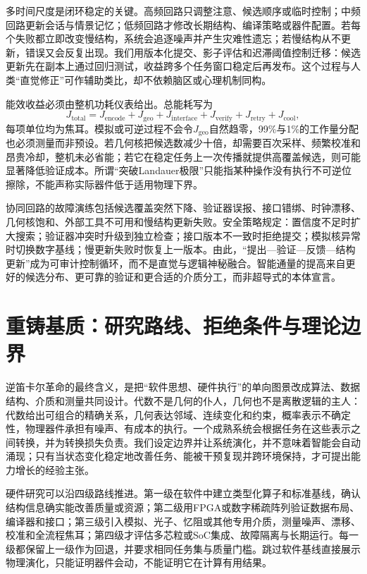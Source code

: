 多时间尺度是闭环稳定的关键。高频回路只调整注意、候选顺序或临时控制；中频回路更新会话与情景记忆；低频回路才修改长期结构、编译策略或器件配置。若每个失败都立即改变慢结构，系统会追逐噪声并产生灾难性遗忘；若慢结构从不更新，错误又会反复出现。我们用版本化提交、影子评估和迟滞阈值控制迁移：候选更新先在副本上通过回归测试，收益跨多个任务窗口稳定后再发布。这个过程与人类“直觉修正”可作辅助类比，却不依赖脑区或心理机制同构。

能效收益必须由整机功耗仪表给出。总能耗写为
\[
J_{\mathrm{total}}=
J_{\mathrm{encode}}+J_{\mathrm{geo}}+
J_{\mathrm{interface}}+J_{\mathrm{verify}}+
J_{\mathrm{retry}}+J_{\mathrm{cool}},
\]
每项单位均为焦耳。模拟或可逆过程不会令$J_{\mathrm{geo}}$自然趋零，99\%与1\%的工作量分配也必须测量而非预设。若几何核把候选数减少十倍，却需要百次采样、频繁校准和昂贵冷却，整机未必省能；若它在稳定任务上一次传播就提供高覆盖候选，则可能显著降低验证成本。所谓“突破Landauer极限”只能指某种操作没有执行不可逆位擦除，不能声称实际器件低于适用物理下界。

协同回路的故障演练包括候选覆盖突然下降、验证器误报、接口错绑、时钟漂移、几何核饱和、外部工具不可用和慢结构更新失败。安全策略规定：置信度不足时扩大搜索；验证器冲突时升级到独立检查；接口版本不一致时拒绝提交；模拟核异常时切换数字基线；慢更新失败时恢复上一版本。由此，“提出—验证—反馈—结构更新”成为可审计控制循环，而不是直觉与逻辑神秘融合。智能通量的提高来自更好的候选分布、更可靠的验证和更合适的介质分工，而非超导式的本体宣言。

\section{重铸基质：研究路线、拒绝条件与理论边界}
\label{sec:recasting_substrate}

逆笛卡尔革命的最终含义，是把“软件思想、硬件执行”的单向图景改成算法、数据结构、介质和测量共同设计。代数不是几何的仆人，几何也不是离散逻辑的主人：代数给出可组合的精确关系，几何表达邻域、连续变化和约束，概率表示不确定性，物理器件承担有噪声、有成本的执行。一个成熟系统会根据任务在这些表示之间转换，并为转换损失负责。我们设定边界并让系统演化，并不意味着智能会自动涌现；只有当状态变化稳定地改善任务、能被干预复现并跨环境保持，才可提出能力增长的经验主张。

硬件研究可以沿四级路线推进。第一级在软件中建立类型化算子和标准基线，确认结构信息确实能改善质量或资源；第二级用FPGA或数字稀疏阵列验证数据布局、编译器和接口；第三级引入模拟、光子、忆阻或其他专用介质，测量噪声、漂移、校准和全流程焦耳；第四级才评估多芯粒或SoC集成、故障隔离与长期运行。每一级都保留上一级作为回退，并要求相同任务集与质量门槛。跳过软件基线直接展示物理演化，只能证明器件会动，不能证明它在计算有用结果。

